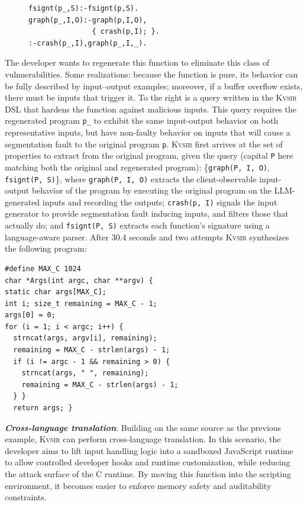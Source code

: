 \documentclass[sigplan,review,anonymous,10pt]{acmart}
\newcommand{\sys}{{\scshape Kv{\textalpha}sir}\xspace}
\newcommand{\heading}[1]{\vspace{2pt}\noindent\textbf{\emph{#1}}:\enspace}
\newcommand{\ttt}[1]{\texttt{#1}\xspace}
\newcommand{\prop}[1]{\setlength{\fboxsep}{1.75pt}\colorbox{lightperiwinkle}{\texttt{#1}}}
\begin{document}
\begin{figure}
\begin{verbatim}
fsignt(p_,S):-fsignt(p,S).
graph(p_,I,O):-graph(p,I,O),
               { crash(p,I); }.
:-crash(p_,I),graph(p_,I,_).
\end{verbatim}
\end{figure}
The developer wants to regenerate this function to eliminate this class of vulnuerabilities.
Some realizations: because the function is pure, its behavior can be fully described by input–output examples; moreover, if a buffer overflow exists, there must be inputs that trigger it.
To the right is a query written in the \sys DSL that hardens the function 
against malicious inputs.
This query requires the regenerated program \ttt{p\_} to exhibit the same
input-output behavior on both representative inputs, but have non-faulty behavior on inputs that will cause a segmentation fault to the original program \ttt{p}.
\sys first arrives at the set of properties to extract from the
original program, given the query (capital \ttt{P} here matching both the original and regenerated program):
\{\prop{graph(P, I, O)}, \prop{fsignt(P, S)}\}, where
\prop{graph(P, I, O)} extracts the client-observable input-output behavior of the program
by executing the original program on the LLM-generated inputs and recording the outputs;
\prop{crash(p, I)} signals the input generator to provide segmentation fault inducing inputs, 
and filters those that actually do;
and \prop{fsignt(P, S)} extracts each function's signature using a language-aware parser.
After 30.4 seconds and two attempts \sys synthesizes the following program:
\begin{verbatim}
#define MAX_C 1024
char *Args(int argc, char **argv) {
static char args[MAX_C];
int i; size_t remaining = MAX_C - 1;
args[0] = 0;
for (i = 1; i < argc; i++) {
  strncat(args, argv[i], remaining);
  remaining = MAX_C - strlen(args) - 1;
  if (i != argc - 1 && remaining > 0) {
    strncat(args, " ", remaining);
    remaining = MAX_C - strlen(args) - 1;
  } }
  return args; }
\end{verbatim}

\heading{Cross-language translation}
Building on the same source as the previous example, \sys can perform
cross-language translation.
In this scenario, the developer aims to lift input
handling logic into a sandboxed JavaScript runtime to allow controlled
developer hooks and runtime customization, while reducing the attack surface of
the C runtime.
By moving this function into the scripting environment, it
becomes easier to enforce memory safety and auditability constraints.
\end{document}
